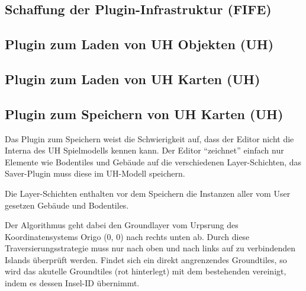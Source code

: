 \subsection{Schaffung der Plugin-Infrastruktur (FIFE)}

\subsection{Plugin zum Laden von UH Objekten (UH)}
\subsection{Plugin zum Laden von UH Karten (UH)}
\subsection{Plugin zum Speichern von UH Karten (UH)}
Das Plugin zum Speichern weist die Schwierigkeit auf, dass der Editor nicht die
Interna des UH Spielmodells kennen kann. Der Editor ``zeichnet'' einfach nur
Elemente wie Bodentiles und Gebäude auf die verschiedenen Layer-Schichten, das
Saver-Plugin muss diese im UH-Modell speichern. 


Die Layer-Schichten enthalten vor dem Speichern die Instanzen aller vom User
gesetzen Gebäude und Bodentiles. 

Der Algorithmus geht dabei den Groundlayer vom Urpsrung des Koordinatensystems
Origo (0, 0) nach rechts unten ab. Durch diese Traversierungsstrategie muss nur
nach oben und nach links auf zu verbindenden Islands überprüft werden. Findet
sich ein direkt angrenzendes Groundtiles, so wird das akutelle Groundtiles (rot
hinterlegt) mit dem bestehenden vereinigt, indem es dessen Insel-ID übernimmt.

